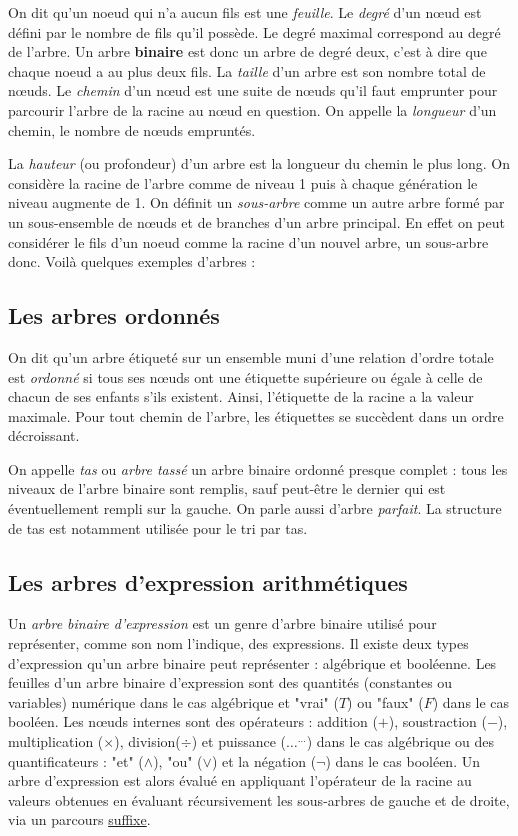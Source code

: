 \documentclass{report}
\begin{document}
On dit qu'un noeud qui n'a aucun fils est une \textit{feuille}.
Le \textit{degré} d'un nœud est défini par le nombre de fils qu'il possède. Le degré maximal correspond au degré de l'arbre.
Un arbre \textbf{binaire} est donc un arbre de degré deux, c'est à dire que chaque noeud a au plus deux fils.
La \textit{taille} d'un arbre est son nombre total de nœuds.
Le \textit{chemin} d'un nœud est une suite de nœuds qu'il faut emprunter pour parcourir l'arbre de la racine au nœud en question. On appelle la \textit{longueur} d'un chemin, le nombre de nœuds empruntés.

La \textit{hauteur} (ou profondeur) d'un arbre est la longueur du chemin le plus long.
On considère la racine de l'arbre comme de niveau 1 puis à chaque génération le niveau augmente de 1.
On définit un \textit{sous-arbre} comme un autre arbre formé par un sous-ensemble de nœuds et de branches d'un arbre principal. En effet on peut considérer le fils d'un noeud comme la racine d'un nouvel arbre, un sous-arbre donc. 
Voilà quelques exemples d'arbres :

\subsection{Les arbres ordonnés}

On dit qu'un arbre étiqueté sur un ensemble muni d'une relation d'ordre totale est \textit{ordonné} si tous ses nœuds ont une étiquette supérieure ou égale à celle de chacun de ses enfants s'ils existent. Ainsi, l'étiquette de la racine a la valeur maximale. Pour tout chemin de l'arbre, les étiquettes se succèdent dans un ordre décroissant.

On appelle \textit{tas} ou \textit{arbre tassé} un arbre binaire ordonné presque complet : tous les niveaux de l'arbre binaire sont remplis, sauf peut-être le dernier qui est éventuellement rempli sur la gauche. On parle aussi d'arbre \textit{parfait}. La structure de tas est notamment utilisée pour le tri par tas. 

\subsection{Les arbres d'expression arithmétiques}

Un \textit{arbre binaire d'expression} est un genre d'arbre binaire utilisé pour représenter, comme son nom l'indique, des expressions. Il existe deux types d'expression qu'un arbre binaire peut représenter : algébrique et booléenne.
Les feuilles d'un arbre binaire d'expression sont des quantités (constantes ou variables) numérique dans le cas algébrique et "vrai" ($T$) ou "faux" ($F$) dans le cas booléen.
Les nœuds internes sont des opérateurs : addition ($+$), soustraction ($-$), multiplication ($\times$), division($\div$) et puissance ($\ldots^{\ldots}$) dans le cas algébrique ou des quantificateurs : "et" ($\wedge$), "ou" ($\vee$) et la négation ($\neg$) dans le cas booléen.
Un arbre d'expression est alors évalué en appliquant l'opérateur de la racine au valeurs obtenues en évaluant récursivement les sous-arbres de gauche et de droite, via un parcours \hyperref[suffixe]{suffixe}. 
\end{document}
